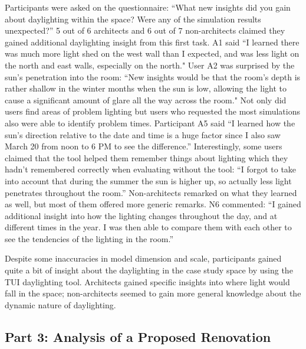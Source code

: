 \documentclass[review]{vgtc}                 %
\begin{document}
Participants were asked on the questionnaire: ``What new insights did
you gain about daylighting within the space?  Were any of the
simulation results unexpected?''
%
5 out of 6 architects and 6 out of 7 non-architects claimed they
gained additional daylighting insight from this first task.  A1 said
``I learned there was much more light shed on the west wall than I
expected, and was less light on the north and east walls, especially
on the north."  User A2 was surprised by the sun's penetration into
the room: ``New insights would be that the room's depth is rather
shallow in the winter months when the sun is low, allowing the light
to cause a significant amount of glare all the way across the room."
Not only did users find areas of problem lighting but users who
requested the most simulations also were able to identify problem
times.  Participant A5 said ``I learned how the sun's direction
relative to the date and time is a huge factor since I also saw March
20 from noon to 6 PM to see the difference.''  Interestingly, some
users claimed that the tool helped them remember things about lighting
which they hadn't remembered correctly when evaluating without the
tool: ``I forgot to take into account that during the summer the sun
is higher up, so actually less light penetrates throughout the room.''
Non-architects remarked on what they learned as well, but most of them
offered more generic remarks.  N6 commented: ``I gained additional
insight into how the lighting changes throughout the day, and at
different times in the year.  I was then able to compare them with
each other to see the tendencies of the lighting in the room.''

Despite some inaccuracies in model dimension and scale, participants
gained quite a bit of insight about the daylighting in the case study
space by using the TUI daylighting tool.  Architects gained specific
insights into where light would fall in the space; non-architects
seemed to gain more general knowledge about the dynamic nature of
daylighting.

\subsection{Part 3: Analysis of a Proposed Renovation}
\end{document}

